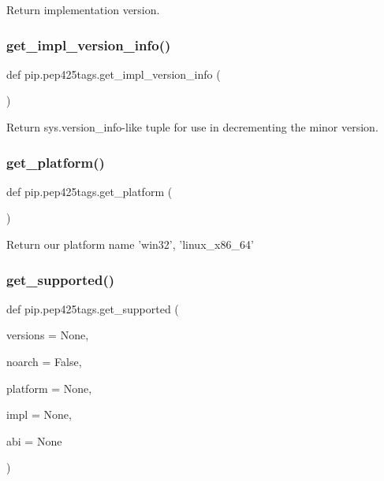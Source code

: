 \begin{DoxyVerb}Return implementation version.\end{DoxyVerb}
 \mbox{\label{namespacepip_1_1pep425tags_ab3a959a4b6cd0ecf4bd6668b8d394860}} 
\subsubsection{\texorpdfstring{get\+\_\+impl\+\_\+version\+\_\+info()}{get\_impl\_version\_info()}}
{\footnotesize\ttfamily def pip.\+pep425tags.\+get\+\_\+impl\+\_\+version\+\_\+info (\begin{DoxyParamCaption}{ }\end{DoxyParamCaption})}

\begin{DoxyVerb}Return sys.version_info-like tuple for use in decrementing the minor
version.\end{DoxyVerb}
 \mbox{\label{namespacepip_1_1pep425tags_ad671021e73547a714ef2da952dbffa4f}} 
\subsubsection{\texorpdfstring{get\+\_\+platform()}{get\_platform()}}
{\footnotesize\ttfamily def pip.\+pep425tags.\+get\+\_\+platform (\begin{DoxyParamCaption}{ }\end{DoxyParamCaption})}

\begin{DoxyVerb}Return our platform name 'win32', 'linux_x86_64'\end{DoxyVerb}
 \mbox{\label{namespacepip_1_1pep425tags_a4a5b16312b8aa61715a75c4b60b2f1b7}} 
\subsubsection{\texorpdfstring{get\+\_\+supported()}{get\_supported()}}
{\footnotesize\ttfamily def pip.\+pep425tags.\+get\+\_\+supported (\begin{DoxyParamCaption}\item[{}]{versions = {\ttfamily None},  }\item[{}]{noarch = {\ttfamily False},  }\item[{}]{platform = {\ttfamily None},  }\item[{}]{impl = {\ttfamily None},  }\item[{}]{abi = {\ttfamily None} }\end{DoxyParamCaption})}

